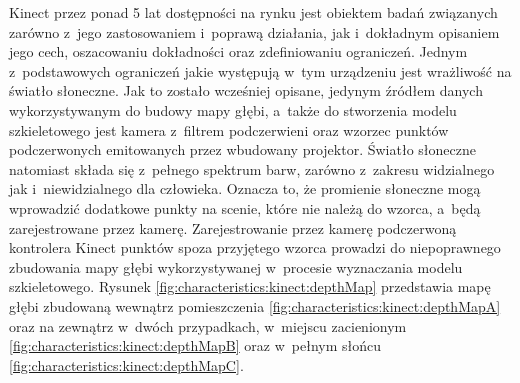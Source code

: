 Kinect przez ponad 5 lat dostępności na rynku jest obiektem badań związanych zarówno z~jego zastosowaniem i~poprawą działania, jak i~dokładnym opisaniem jego cech, oszacowaniu dokładności oraz zdefiniowaniu ograniczeń. Jednym z~podstawowych ograniczeń jakie występują w~tym urządzeniu jest wrażliwość na światło słoneczne. Jak to zostało wcześniej opisane, jedynym źródłem danych wykorzystywanym do budowy mapy głębi, a~także do stworzenia modelu szkieletowego jest kamera z~filtrem podczerwieni oraz wzorzec punktów podczerwonych emitowanych przez wbudowany projektor. Światło słoneczne natomiast składa się z~pełnego spektrum barw, zarówno z~zakresu widzialnego jak i~niewidzialnego dla człowieka. Oznacza to, że promienie słoneczne mogą wprowadzić dodatkowe punkty na scenie, które nie należą do wzorca, a~będą zarejestrowane przez kamerę. Zarejestrowanie przez kamerę podczerwoną kontrolera Kinect punktów spoza przyjętego wzorca prowadzi do niepoprawnego zbudowania mapy głębi wykorzystywanej w~procesie wyznaczania modelu szkieletowego. Rysunek \ref{fig:characteristics:kinect:depthMap} przedstawia mapę głębi zbudowaną wewnątrz pomieszczenia \ref{fig:characteristics:kinect:depthMapA} oraz na zewnątrz w~dwóch przypadkach, w~miejscu zacienionym \ref{fig:characteristics:kinect:depthMapB} oraz w~pełnym słońcu \ref{fig:characteristics:kinect:depthMapC}. 
																																	
